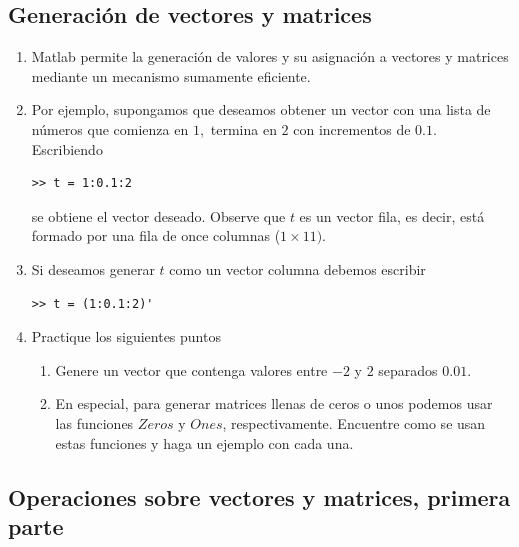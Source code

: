 \subsection{Generaci\'{o}n de vectores y matrices}

\begin{enumerate}
\item Matlab permite la generaci\'{o}n de valores y su asignaci\'{o}n a
vectores y matrices mediante un mecanismo sumamente eficiente. 

\item Por ejemplo, supongamos que deseamos obtener un vector con una lista de
n\'{u}meros que comienza en $1,$ termina en $2$ con
incrementos de $0.1$. Escribiendo
\begin{verbatim}
>> t = 1:0.1:2
\end{verbatim}
se obtiene el vector deseado. Observe que $t$ es un vector fila, es
decir, est\'{a} formado por una fila de once columnas ($1 \times 11).$

\item Si deseamos generar $t$ como un vector columna debemos escribir
\begin{verbatim}
>> t = (1:0.1:2)'
\end{verbatim}

\item Practique los siguientes puntos
\begin{enumerate}
\item Genere un vector que contenga valores entre $-2$ y $2$ separados
  $0.01$.

\item En especial, para generar matrices llenas de ceros o unos
  podemos usar las funciones $Zeros$ y $Ones$, respectivamente.
  Encuentre como se usan estas funciones y haga un ejemplo con cada
  una.
\end{enumerate}

\end{enumerate}

\subsection{Operaciones sobre vectores y matrices,  primera parte}

